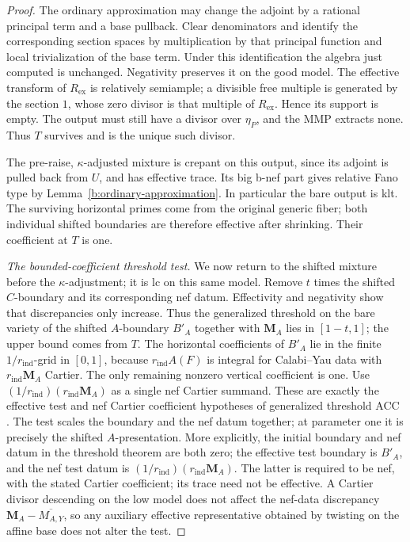 \begin{proof}
The ordinary approximation may change the adjoint by a rational
principal term and a base pullback. Clear denominators and identify
the corresponding section spaces by multiplication by that principal
function and local trivialization of the base term. Under this
identification the algebra just computed is unchanged. Negativity
preserves it on the good model. The effective transform of
\(R_{\mathrm{ex}}\) is relatively semiample; a divisible free multiple
is generated by the section \(1\), whose zero divisor is that multiple
of \(R_{\mathrm{ex}}\). Hence its support is empty.
The output must still have a divisor over \(\eta_P\), and the MMP
extracts none. Thus \(T\) survives and is the unique such divisor.

The pre-raise, \(\kappa\)-adjusted mixture is crepant on this output,
since its adjoint is pulled back from \(U\), and has effective trace.
Its big b-nef part gives relative Fano type by
Lemma~\ref{b:ordinary-approximation}. In particular the bare output
is klt. The surviving horizontal primes come from the original
generic fiber; both individual shifted boundaries are therefore
effective after shrinking. Their coefficient at \(T\) is one.

\medskip\noindent
\emph{The bounded-coefficient threshold test.}
We now return to the shifted mixture before the \(\kappa\)-adjustment;
it is lc on this same model. Remove \(t\) times the shifted
\(C\)-boundary and its corresponding nef datum. Effectivity and
negativity show that discrepancies only increase. Thus the
generalized threshold on the bare variety of the
shifted \(A\)-boundary \(B'_A\) together with \(\mathbf M_A\) lies in
\([1-t,1]\); the upper bound comes from \(T\).
The horizontal coefficients of \(B'_A\) lie in the finite
\(1/r_{\mathrm{ind}}\)-grid in \([0,1]\), because \(r_{\mathrm{ind}}A(F)\) is integral for Calabi--Yau
data with \(r_{\mathrm{ind}}\mathbf M_A\) Cartier. The only remaining nonzero vertical
coefficient is one. Use \((1/r_{\mathrm{ind}})(r_{\mathrm{ind}}\mathbf M_A)\) as a single nef
Cartier summand. These are exactly the effective test and nef
Cartier coefficient hypotheses of generalized threshold ACC
\cite[Theorem 1.5]{BirkarZhang}. The test scales the boundary and the
nef datum together; at parameter one it is precisely the shifted
\(A\)-presentation. More explicitly, the initial boundary and nef
datum in the threshold theorem are both zero; the effective test
boundary is \(B'_A\), and the nef test datum is
\((1/r_{\mathrm{ind}})(r_{\mathrm{ind}}\mathbf M_A)\).
The latter is required to be nef, with the stated Cartier coefficient;
its trace need not be effective. A Cartier divisor descending on the low model
does not affect the nef-data discrepancy
\(\mathbf M_A-\overline{M_{A,Y}}\), so any auxiliary effective
representative obtained by twisting on the affine base does not
alter the test.


\end{proof}
